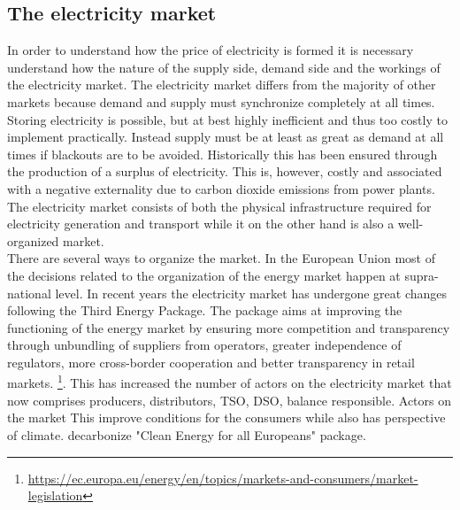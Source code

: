 \label{sec:theory}

\subsection{The electricity market}
\label{subsec:t_market}
In order to understand how the price of electricity is formed it is necessary understand how the nature of the supply side, demand side and the workings of the electricity market. The electricity market differs from the majority of other markets because demand and supply must synchronize completely at all times. Storing electricity is possible, but at best highly inefficient and thus too costly to implement practically. Instead supply must be at least as great as demand at all times if blackouts are to be avoided. Historically this has been ensured through the production of a surplus of electricity. This is, however, costly and associated with a  negative externality due to carbon dioxide emissions from power plants. \smallskip\\
The electricity market consists of both the physical infrastructure required for electricity generation and transport while it on the other hand is also a well-organized market.
\smallskip\\
There are several ways to organize the market. In the European Union most of the decisions related to the organization of the energy market happen at supra-national level. In recent years the electricity market has undergone great changes following the Third Energy Package. The package aims at improving the functioning of the energy market by ensuring more competition and transparency through unbundling of suppliers from operators, greater independence of regulators, more cross-border cooperation and better transparency in retail markets. \footnote{\url{https://ec.europa.eu/energy/en/topics/markets-and-consumers/market-legislation}}. This has increased the number of actors on the electricity market that now comprises producers, distributors, TSO, DSO, balance responsible.
Actors on the market
This improve conditions for the consumers while also has perspective of climate.
decarbonize
"Clean Energy for all Europeans" package.

